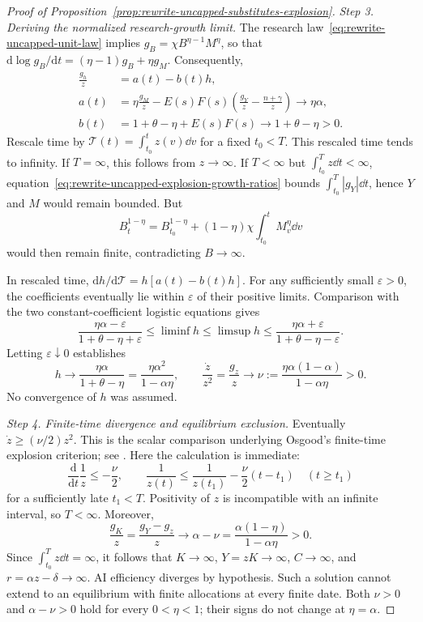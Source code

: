 \begin{proof}[Proof of Proposition~\ref{prop:rewrite-uncapped-substitutes-explosion}]
\textit{Step 3. Deriving the normalized research-growth limit.}
The research law~\eqref{eq:rewrite-uncapped-unit-law} implies
$g_B=\chi B^{\eta-1}M^\eta$, so that
$\mathrm d\log g_B/\mathrm dt=(\eta-1)g_B+\eta g_M$.
Consequently,
\begin{align*}
 \frac{g_h}{z}&=a(t)-b(t)h,\\
 a(t)&=\eta\frac{g_M}{z}
 -E(s)F(s)\left(\frac{g_Y}{z}-\frac{n+\gamma}{z}\right)\to\eta\alpha,\\
 b(t)&=1+\theta-\eta+E(s)F(s)\to1+\theta-\eta>0.
\end{align*}
Rescale time by $\mathcal T(t)=\int_{t_0}^t z(v)\dd v$ for a fixed $t_0<T$.
This rescaled time tends to infinity. If $T=\infty$, this follows from
$z\to\infty$. If $T<\infty$ but $\int_{t_0}^T z\dd t<\infty$,
equation~\eqref{eq:rewrite-uncapped-explosion-growth-ratios} bounds
$\int_{t_0}^T|g_Y|\dd t$, hence $Y$ and $M$ would remain bounded. But
\[
 B_t^{1-\eta}=B_{t_0}^{1-\eta}
 +(1-\eta)\chi\int_{t_0}^t M_v^\eta\dd v
\]
would then remain finite, contradicting $B\to\infty$.

In rescaled time, $\mathrm dh/\mathrm d\mathcal T=h[a(t)-b(t)h]$.
For any sufficiently small $\varepsilon>0$, the coefficients eventually lie
within $\varepsilon$ of their positive limits. Comparison with the two
constant-coefficient logistic equations gives
\[
 \frac{\eta\alpha-\varepsilon}{1+\theta-\eta+\varepsilon}
 \leq\liminf h\leq\limsup h\leq
 \frac{\eta\alpha+\varepsilon}{1+\theta-\eta-\varepsilon}.
\]
Letting $\varepsilon\downarrow0$ establishes
\begin{equation}
 h\to\frac{\eta\alpha}{1+\theta-\eta}
     =\frac{\eta\alpha^2}{1-\alpha\eta},
 \qquad
 \frac{\dot z}{z^2}=\frac{g_z}{z}
 \to\nu:=\frac{\eta\alpha(1-\alpha)}{1-\alpha\eta}>0.
 \label{eq:rewrite-uncapped-explosion-research-limit}
\end{equation}
No convergence of $h$ was assumed.

\textit{Step 4. Finite-time divergence and equilibrium exclusion.}
Eventually $\dot z\geq(\nu/2)z^2$. This is the scalar comparison underlying
Osgood's finite-time explosion criterion; see
\citet[Lemma 2.2 and Theorem 3.1]{ceballosetal2011}.
Here the calculation is immediate:
\[
 \frac{\mathrm d}{\mathrm dt}\frac1z\leq-\frac\nu2,
 \qquad
 \frac1{z(t)}\leq\frac1{z(t_1)}-\frac\nu2(t-t_1)
 \quad(t\geq t_1)
\]
for a sufficiently late $t_1<T$. Positivity of $z$ is incompatible with an
infinite interval, so $T<\infty$.
Moreover,
\[
 \frac{g_K}{z}=\frac{g_Y-g_z}{z}
 \to\alpha-\nu=\frac{\alpha(1-\eta)}{1-\alpha\eta}>0.
\]
Since $\int_{t_0}^T z\dd t=\infty$, it follows that $K\to\infty$,
$Y=zK\to\infty$, $C\to\infty$, and $r=\alpha z-\delta\to\infty$.
AI efficiency diverges by hypothesis. Such a solution cannot extend to an
equilibrium with finite allocations at every finite date. Both
$\nu>0$ and $\alpha-\nu>0$ hold for every $0<\eta<1$; their signs do not change
at $\eta=\alpha$.
\end{proof}


